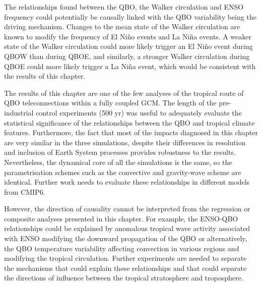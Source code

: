 The relationships found between the QBO, the Walker circulation and ENSO frequency could potentially be causally linked with the QBO variability being the driving mechanism. Changes to the mean state of the Walker circulation are known to modify the frequency of El Niño events and La Niña events. A weaker state of the Walker circulation could more likely trigger an El Niño event during QBOW than during QBOE, and similarly, a stronger Walker circulation during QBOE could more likely trigger a La Niña event, which would be consistent with the results of this chapter. 

 
 The results of this chapter are one of the few analyses of the tropical route of QBO teleconnections within a fully coupled GCM. 
 The length of the pre-industrial control experiments (500 yr) was useful to adequately evaluate the statistical significance of the relationships between the QBO and tropical climate features. 
Furthermore, the fact that most of the impacts diagnosed in this chapter are very similar in the three simulations, despite their differences in resolution and inclusion of Earth System processes provides robustness to the results. Nevertheless, the dynamical core of all the simulations is the same, so the parametrisation schemes such as the convective and gravity-wave scheme are identical. Further work needs to evaluate these relationships in different models from CMIP6.
 
 However, the direction of causality cannot be interpreted from the regression or composite analyses presented in this chapter. For example, the ENSO-QBO relationships could be explained by anomalous tropical wave activity associated with ENSO modifying the downward propagation of the QBO \citep{schirber2015} or alternatively, the QBO temperature variability affecting convection in various regions and modifying the tropical circulation. 
Further experiments are needed to separate the mechanisms that could explain these relationships and that could separate the directions of influence between the tropical stratosphere and troposphere. 
 
 


